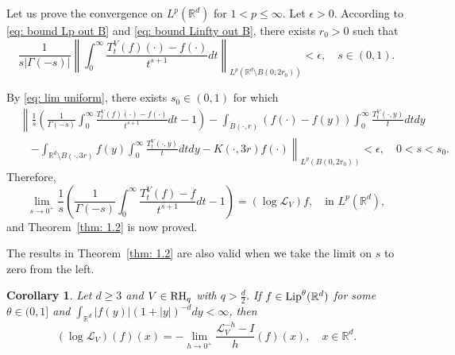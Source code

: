 \documentclass[10pt, a4paper, reqno]{amsart}
\newtheorem{cor}[thm]{Corollary}
\theoremstyle{definition}
\theoremstyle{remark}
\newcommand{\RR}{\mathbb{R}}
\newcommand{\RH}{\textup{RH}}
\newcommand{\Lip}{\textup{Lip}}
\numberwithin{equation}{section}
\begin{document}
Let us prove the convergence on $L^p(\RR^d)$ for $1<p\leq \infty$. Let $\epsilon>0$. According to \eqref{eq: bound Lp out B} and \eqref{eq: bound Linfty out B}, there exists $r_0>0$ such that
\[\frac{1}{s|\Gamma(-s)|}\left\|\int_0^\infty \frac{T_t^V(f)(\cdot)-f(\cdot)}{t^{s+1}}dt\right\|_{L^p(\RR^d\setminus B(0,2r_0))}<\epsilon, \quad s\in (0,1).\]

By \eqref{eq: lim uniform}, there exists $s_0\in (0,1)$ for which
\begin{align*}
    &\left\|\frac1s \left(\frac{1}{\Gamma(-s)}\int_0^\infty \frac{T_t^V(f)(\cdot)-f(\cdot)}{t^{s+1}}dt-1\right)-\int_{B(\cdot,r)}(f(\cdot)-f(y))\int_0^\infty \frac{T_t^V(\cdot,y)}{t}dtdy\right. \\
    & \quad \left.-\int_{\RR^d\setminus B(\cdot,3r)} f(y)\int_0^\infty \frac{T_t^V(\cdot,y)}{t}dtdy-K(\cdot,3r)f(\cdot)\right\|_{L^p(B(0,2r_0))}<\epsilon, \quad 0<s<s_0.
\end{align*}
Therefore,
\[\lim_{s\to 0^+} \frac1s \left(\frac{1}{\Gamma(-s)}\int_0^\infty \frac{T_t^V(f)-f}{t^{s+1}}dt-1\right)=(\log \mathcal{L}_V)f, \quad \text{in }L^p(\RR^d),\]
and Theorem~\ref{thm: 1.2} is now proved.

The results in Theorem~\ref{thm: 1.2} are also valid when we take the limit on $s$ to zero from the left.


\begin{cor}\label{coro: 2.1}
    Let $d\geq 3$ and $V\in \RH_q$ with $q>\frac d2$. If $f\in \Lip^\theta (\RR^d)$ for some $\theta\in (0,1]$ and $\int_{\RR^d} |f(y)|(1+|y|)^{-d}dy<\infty$, then
    \[(\log \mathcal{L}_V)(f)(x)=-\lim_{h\to 0^+}\frac{\mathcal{L}^{-h}_V-I}{h}(f)(x), \quad  x\in \RR^d.\]
\end{cor}
\end{document}
